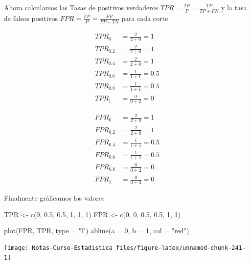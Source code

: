 \documentclass[
  12pt,
]{book}
\newenvironment{Shaded}{\begin{snugshade}}{\end{snugshade}}
\newcommand{\AttributeTok}[1]{\textcolor[rgb]{0.77,0.63,0.00}{#1}}
\newcommand{\DecValTok}[1]{\textcolor[rgb]{0.00,0.00,0.81}{#1}}
\newcommand{\FloatTok}[1]{\textcolor[rgb]{0.00,0.00,0.81}{#1}}
\newcommand{\FunctionTok}[1]{\textcolor[rgb]{0.00,0.00,0.00}{#1}}
\newcommand{\NormalTok}[1]{#1}
\newcommand{\OtherTok}[1]{\textcolor[rgb]{0.56,0.35,0.01}{#1}}
\newcommand{\StringTok}[1]{\textcolor[rgb]{0.31,0.60,0.02}{#1}}
\begin{document}
Ahora calculamos las Tasas de positivos verdaderos
\(TPR = \frac{TP}{P} = \frac{TP}{TP+FN}\) y la tasa de falsos positivos
\(FPR = \frac{FP}{P} = \frac{FP}{FP+TN}\) para cada corte

\begin{align*}
TPR_0 &= \frac{2}{2+0} = 1\\
TPR_{0.2} &= \frac{2}{2+0} =1\\
TPR_{0.4} &= \frac{2}{2+0} =1\\
TPR_{0.6} &= \frac{1}{1+1} =0.5\\
TPR_{0.8} &= \frac{1}{1+1} =0.5\\
TPR_{1} &= \frac{0}{0+2} = 0
\end{align*}

\begin{align*}
FPR_0 &= \frac{2}{2+0} = 1\\
FPR_{0.2} &= \frac{2}{2+0} =1\\
FPR_{0.4} &= \frac{1}{1+1} =0.5\\
FPR_{0.6} &= \frac{1}{1+1} =0.5\\
FPR_{0.8} &= \frac{0}{0+2} =0 \\
FPR_{1} &= \frac{0}{0+2} =0 
\end{align*}

Finalmente gráficamos los valores

\begin{Shaded}
\begin{Highlighting}[]
\NormalTok{TPR }\OtherTok{\textless{}{-}} \FunctionTok{c}\NormalTok{(}\DecValTok{0}\NormalTok{, }\FloatTok{0.5}\NormalTok{, }\FloatTok{0.5}\NormalTok{, }\DecValTok{1}\NormalTok{, }\DecValTok{1}\NormalTok{, }\DecValTok{1}\NormalTok{)}
\NormalTok{FPR }\OtherTok{\textless{}{-}} \FunctionTok{c}\NormalTok{(}\DecValTok{0}\NormalTok{, }\DecValTok{0}\NormalTok{, }\FloatTok{0.5}\NormalTok{, }\FloatTok{0.5}\NormalTok{, }\DecValTok{1}\NormalTok{, }\DecValTok{1}\NormalTok{)}

\FunctionTok{plot}\NormalTok{(FPR, TPR, }\AttributeTok{type =} \StringTok{"l"}\NormalTok{)}
\FunctionTok{abline}\NormalTok{(}\AttributeTok{a =} \DecValTok{0}\NormalTok{, }\AttributeTok{b =} \DecValTok{1}\NormalTok{, }\AttributeTok{col =} \StringTok{"red"}\NormalTok{)}
\end{Highlighting}
\end{Shaded}

\begin{center}\texttt{[image: Notas-Curso-Estadistica\_files/figure-latex/unnamed-chunk-241-1]} \end{center}
\end{document}
